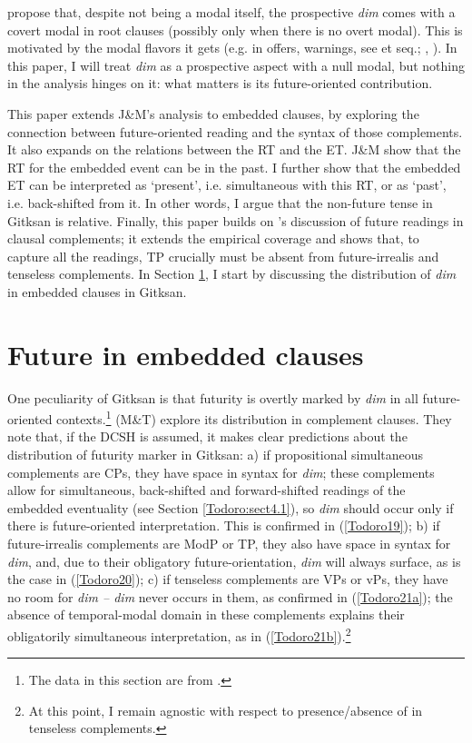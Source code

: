 \documentclass[output=paper]{langscibook}
\begin{document}
\citealt{todorovietal2020a} propose that, despite not being a modal itself, the prospective \textit{dim} comes with a covert modal in root clauses (possibly only when there is no overt modal). This is motivated by the modal flavors it gets (e.g. in offers, warnings, see \citealt{copley2009a} et seq.; \citealt{klechaetal2008a}, \citealt{klecha2011a}). In this paper, I will treat \emph{dim} as a prospective aspect with a null modal, but nothing in the analysis hinges on it: what matters is its future-oriented contribution. 

This paper extends J\&M’s analysis to embedded clauses, by exploring the connection between future-oriented reading and the syntax of those complements. It also expands on the relations between the RT and the ET. J\&M show that the RT for the embedded event can be in the past. I further show that the embedded ET can be interpreted as ‘present’, i.e. simultaneous with this RT, or as ‘past’, i.e. back-shifted from it. In other words, I argue that the non-future tense in Gitksan is relative. Finally, this paper builds on \citet{matthewson2018a}’s discussion of future readings in clausal complements; it extends the empirical coverage and shows that, to capture all the readings, TP crucially must be absent from future-irrealis and tenseless complements. In Section \ref{Todoro:sect3}, I start by discussing the distribution of \emph{dim} in embedded clauses in Gitksan. 

\section{Future in embedded clauses}\label{Todoro:sect3}

One peculiarity of Gitksan is that futurity is overtly marked by \emph{dim} in all future-oriented contexts.\footnote{The data in this section are from \citet{matthewson2018a}.} \citealt{matthewson2018a} (M\&T) explore its distribution in complement clauses. They note that, if the DCSH is assumed, it makes clear predictions about the distribution of futurity marker in Gitksan: a) if propositional simultaneous complements are CPs, they have space in syntax for \emph{dim}; these complements allow for simultaneous, back-shifted and forward-shifted readings of the embedded eventuality (see Section \ref{Todoro:sect4.1}), so \emph{dim} should occur only if there is future-oriented interpretation. This is confirmed in (\ref{Todoro19}); b) if future-irrealis complements are ModP or TP, they also have space in syntax for \emph{dim}, and, due to their obligatory future-orientation, \emph{dim} will always surface, as is the case in (\ref{Todoro20}); c) if tenseless complements are VPs or vPs, they have no room for \emph{dim – dim} never occurs in them, as confirmed in (\ref{Todoro21a}); the absence of temporal-modal domain in these complements explains their obligatorily simultaneous interpretation, as in (\ref{Todoro21b}).\footnote{At this point, I remain agnostic with respect to presence/absence of  in tenseless complements.}  
\end{document}
